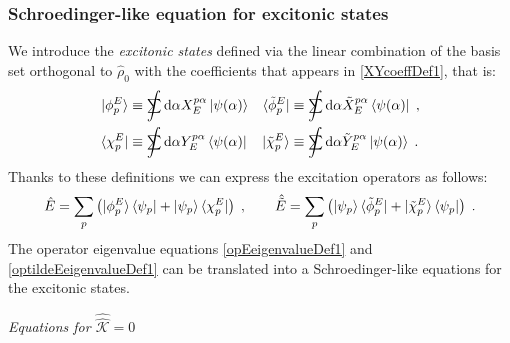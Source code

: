 \documentclass[a4paper]{article}
\newcommand{\dd}{{\rm d}}
\newcommand{\sint}{\mathrlap{\displaystyle\int}
\mathrlap{\textstyle\sum}
\phantom{\mathrlap{\displaystyle
\int}\textstyle\sum}}
\newcommand{\be}{\begin{equation}}
\newcommand{\ee}{\end{equation}}
\newcommand{\nn}{\notag}
\newcommand{\qq}{\qquad}
\newcommand{\lb}{\label}
\newcommand{\op}[1]{\hat {#1}}
\newcommand{\sop}[1]{\op{\op {#1}}}
\newcommand{\tket}[1]{| \tilde #1 \rangle}
\newcommand{\tbra}[1]{\langle \tilde #1 |}
\newcommand{\dmnot}{\op{\rho}_0}
\newcommand{\coupl}{\sop{\mathcal K}}
\begin{document}
\subsubsection{Schroedinger-like equation for excitonic states}

We introduce the \emph{excitonic states} defined via the linear combination of the basis set orthogonal to $\dmnot$ with the
coefficients that appears in \eqref{XYcoeffDef1}, that is:
\begin{align}
\ket{\phi^E_p} &\equiv \sint \dd \alpha X_{E}^{p \alpha} \ket{\psi(\alpha)} &
\tbra{\phi^E_p} &\equiv \sint \dd \alpha {\tilde X_{E}^{p \alpha}} \bra{\psi(\alpha)} \;, \nn\\
\bra{\chi^E_p} &\equiv \sint \dd \alpha  Y_{E}^{p \alpha} \bra{\psi(\alpha)} &
\tket{\chi^E_p} &\equiv \sint \dd \alpha {\tilde Y}_{E}^{p\alpha} \ket{\psi(\alpha)} \;.
\end{align}
Thanks to these definitions we can express the excitation operators as follows:
\be\lb{ExctitationOperatorsDef2}
\op E = \sum_p \left( \ket{\phi^E_p}\bra{\psi_p} + \ket{\psi_p} \bra{\chi^E_p}\right)\;, \qq
\op {\tilde E} = \sum_p \left( \ket{\psi_p} \tbra{\phi^E_p} + \tket{\chi^E_p}\bra{\psi_p} \right)\;.
\ee
The operator eigenvalue equations \eqref{opEeigenvalueDef1} and \eqref{optildeEeigenvalueDef1} can be translated into a Schroedinger-like equations
for the excitonic states. 

\vspace{0.5cm}
\emph{Equations for $\coupl = 0$}
\vspace{0.5cm}
\end{document}
